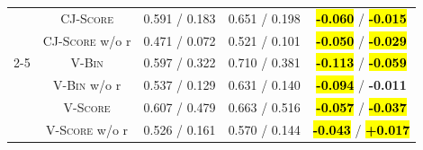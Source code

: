 \begin{table}[t]
\begin{tabular}{@{}c|c|ccc@{}}
         & \textsc{CJ-Score}       & 0.591 / 0.183   & 0.651 / 0.198   & \hl{\textbf{-0.060}} / \hl{\textbf{-0.015}} \\
         & \textsc{CJ-Score} w/o r & 0.471 / 0.072   & 0.521 / 0.101   & \hl{\textbf{-0.050}} / \hl{\textbf{-0.029}} \\
        \cmidrule{2-5}
         & \textsc{V-Bin}          & 0.597 / 0.322   & 0.710 / 0.381   & \hl{\textbf{-0.113}} / \hl{\textbf{-0.059}} \\
         & \textsc{V-Bin} w/o r    & 0.537 / 0.129   & 0.631 / 0.140   & \hl{\textbf{-0.094}} / \textbf{-0.011} \\
         & \textsc{V-Score}        & 0.607 / 0.479   & 0.663 / 0.516   & \hl{\textbf{-0.057}} / \hl{\textbf{-0.037}} \\
         & \textsc{V-Score} w/o r  & 0.526 / 0.161   & 0.570 / 0.144   & \hl{\textbf{-0.043}} / \hl{\textbf{+0.017}} \\
        \bottomrule
    \end{tabular}
    \vspace{-10pt}
\end{table}